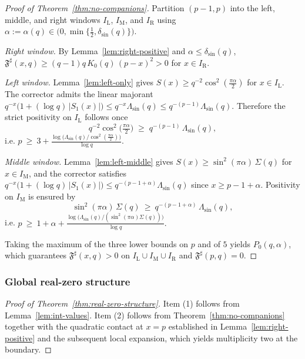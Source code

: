 \documentclass[11pt,a4paper]{amsart}
\newcommand{\Fbase}{\mathfrak F}
\newcommand{\Fsharp}{\Fbase^{\sharp}}
\theoremstyle{plain}
\theoremstyle{definition}
\theoremstyle{remark}
\begin{document}
\begin{proof}[Proof of Theorem~\ref{thm:no-companions}]
Partition $(p-1,p)$ into the left, middle, and right windows $I_{\mathrm L}$, $I_{\mathrm M}$, and $I_{\mathrm R}$ using $\alpha:=\alpha(q)\in\bigl(0,\min\{\tfrac12,\delta_{\sin}(q)\}\bigr)$.

\emph{Right window.} By Lemma~\ref{lem:right-positive} and $\alpha\le\delta_{\sin}(q)$,
\(
\Fsharp(x,q)\ge (q-1)q\,K_0(q)\,(p-x)^2>0
\)
for $x\in I_{\mathrm R}$.

\emph{Left window.} Lemma~\ref{lem:left-only} gives
\(
S(x)\ge q^{-2}\cos^2(\frac{\pi\alpha}{2})
\)
for $x\in I_{\mathrm L}$. The corrector admits the linear majorant
\(
q^{-x}\bigl(1+(\log q)\,|S_1(x)|\bigr)\le q^{-x}\Lambda_{\sin}(q)\le q^{-(p-1)}\Lambda_{\sin}(q).
\)
Therefore the strict positivity on $I_{\mathrm L}$ follows once
\[
q^{-2}\cos^2\!\Big(\tfrac{\pi\alpha}{2}\Big)
\;\ge\; q^{-(p-1)}\,\Lambda_{\sin}(q),
\]
i.e.
\(
p\ \ge\ 3+\frac{\log\!\big(\Lambda_{\sin}(q)/\cos^2(\frac{\pi\alpha}{2})\big)}{\log q}.
\)

\emph{Middle window.} Lemma~\ref{lem:left-middle} gives
\(
S(x)\ge \sin^2(\pi\alpha)\,\Sigma(q)
\)
for $x\in I_{\mathrm M}$, and the corrector satisfies
\(
q^{-x}\bigl(1+(\log q)\,|S_1(x)|\bigr)\le q^{-(p-1+\alpha)}\Lambda_{\sin}(q)
\)
since $x\ge p-1+\alpha$. Positivity on $I_{\mathrm M}$ is ensured by
\[
\sin^2(\pi\alpha)\,\Sigma(q)\ \ge\ q^{-(p-1+\alpha)}\,\Lambda_{\sin}(q),
\]
i.e.
\(
p\ \ge\ 1+\alpha+\frac{\log\!\big(\Lambda_{\sin}(q)/(\sin^2(\pi\alpha)\Sigma(q))\big)}{\log q}.
\)

Taking the maximum of the three lower bounds on $p$ and of $5$ yields $P_0(q,\alpha)$, which guarantees $\Fsharp(x,q)>0$ on $I_{\mathrm L}\cup I_{\mathrm M}\cup I_{\mathrm R}$ and $\Fsharp(p,q)=0$.
\end{proof}

\subsubsection{Global real-zero structure}

\begin{proof}[Proof of Theorem~\ref{thm:real-zero-structure}]
Item (1) follows from Lemma~\ref{lem:int-values}. Item (2) follows from Theorem~\ref{thm:no-companions} together with the quadratic contact at $x=p$ established in Lemma~\ref{lem:right-positive} and the subsequent local expansion, which yields multiplicity two at the boundary.
\end{proof}
\end{document}
